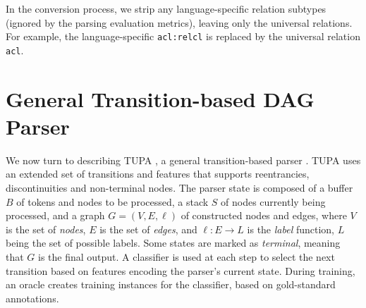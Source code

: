 \documentclass[11pt,a4paper]{article}
\begin{document}
In the conversion process, we strip any language-specific relation subtypes
(ignored by the parsing evaluation metrics),
leaving only the universal relations.
For example, the language-specific \verb|acl:relcl| is replaced by the universal relation \verb|acl|.


\section{General Transition-based DAG Parser}\label{sec:model}

We now turn to describing TUPA \cite{hershcovich2017a,hershcovich2018multitask},
a general transition-based parser \cite{Nivre03anefficient}.
TUPA uses an extended set of transitions and features that supports
reentrancies, discontinuities and non-terminal nodes.
The parser state is composed of a buffer $B$ of tokens and nodes to be processed,
a stack $S$ of nodes currently being processed,
and a graph $G=(V,E,\ell)$ of constructed nodes and edges,
where $V$ is the set of \emph{nodes}, $E$ is the set of \emph{edges},
and $\ell : E \to L$ is the \emph{label} function, $L$ being the set of possible labels.
Some states are marked as \textit{terminal}, meaning that $G$ is the final output.
A classifier is used at each step to select the next transition based on features
encoding the parser's current state.
During training, an oracle creates training instances for the classifier,
based on gold-standard annotations.
\end{document}

